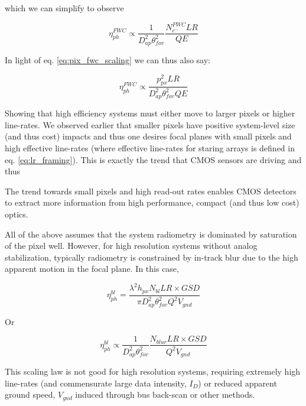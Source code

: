 \documentclass[10pt,journal]{IEEEtran}  %
\begin{document}
which we can simplify to observe

\begin{equation}
    \label{eq:eta_fwc_scaling}
    \eta_{ph}^{FWC} \propto \frac{1}{D_{ap}^2 \theta_{fov}^2} \frac{N_{e^-}^{FWC} LR}{QE}
\end{equation}

In light of eq. \ref{eq:pix_fwc_scaling} we can thus also say:

\begin{equation}
    \label{eq:eta_fwc_scaling}
    \eta_{ph}^{FWC} \propto \frac{p_{px}^2 LR}{D_{ap}^2 \theta_{fov}^2 QE}
\end{equation}

Showing that high efficiency systems must either move to larger pixels or higher line-rates.  We observed earlier that smaller pixels have positive system-level size (and thus cost) impacts and thus one desires focal planes with small pixels and high effective line-rates (where effective line-rates for staring arrays is defined in eq. \ref{eq:lr_framing}).  This is exactly the trend that CMOS sensors are driving and thus

\begin{observation}
The trend towards small pixels and high read-out rates enables CMOS detectors to extract more information from high performance, compact (and thus low cost) optics.
\end{observation}

All of the above assumes that the system radiometry is dominated by saturation of the pixel well.  However, for high resolution systems without analog stabilization, typically radiometry is constrained by in-track blur due to the high apparent motion in the focal plane.  In this case,

\begin{equation}
    \label{eq:eta_ph_blur}
    \eta_{ph}^{bl} = \frac{\lambda^2 h_{px}N_{bl}LR \times GSD}{\pi D_{ap}^2\theta_{fov}^2 Q^2 V_{gnd}}
\end{equation}

Or 

\begin{equation}
    \label{eq:eta_blur_scaling}
    \eta_{ph}^{bl} \propto \frac{1}{D_{ap}^2 \theta_{fov}^2} \frac{N_{blur} LR \times GSD}{Q^2 V_{gnd}}
\end{equation}

This scaling law is not good for high resolution systems, requiring extremely high line-rates (and commensurate large data intensity, $I_{D}$) or reduced apparent ground speed, $V_{gnd}$ induced through bus back-scan or other methods.
\end{document}
